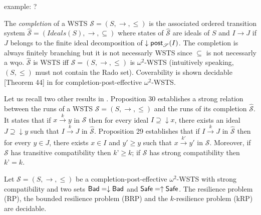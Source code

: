 example: ?
%
%




The \emph{completion}  \cite{BFM-ic17} of a WSTS $\mathscr{S}=(S,\rightarrow, \leq)$ is the associated ordered transition system $\hat{\mathscr{S}}=(Ideals(S),\rightarrow, \subseteq)$ where states of $\hat{\mathscr{S}}$ are ideals of $S$ and $I \rightarrow J$ if $J$ belongs to the finite ideal decomposition of $\downarrow \textsf{post}_{\mathscr{S}}(I)$. The completion is always finitely branching but it is not necessarly WSTS since $\subseteq$ is not necessarly a wqo. $\hat{\mathscr{S}}$ is WSTS iff $\mathscr{S}=(S,\rightarrow, \leq)$ is $\omega^2$-WSTS (intuitively speaking, $(S,\leq)$ must not contain the Rado set). Coverability is shown decidable  [Theorem 44] in \cite{BFM-ic17} for completion-post-effective $\omega^2$-WSTS.

Let us recall two other results in \cite{BFM-ic17}. Proposition 30 establishes a strong relation between the runs of a WSTS $\mathscr{S}=(S,\rightarrow, \leq)$ and the runs of its completion $\hat{\mathscr{S}}$. It states that if $x \xrightarrow{k} y$ in $\mathscr{S}$ then for every ideal $I \supseteq \downarrow x$, there exists an ideal $J \supseteq \downarrow y$ such that $I \xrightarrow{k} J$ in $\hat{\mathscr{S}}$. Proposition 29 establishes that if $I \xrightarrow{k} J$ in $\hat{\mathscr{S}}$ then for every $y \in J$, there exists $x \in I$ and $y' \geq y$ such that $x \xrightarrow{k'} y'$ in $\mathscr{S}$. Moreover, if $\mathscr{S}$ has transitive compatibility then $k’ \geq k$; if $\mathscr{S}$ has strong compatibility then $k’ = k$.


\begin{theorem}\label{down-up}
Let $\mathscr{S}=(S,\rightarrow, \leq)$ be a completion-post-effective $\omega^2$-WSTS with strong compatibility and two 
 sets $\textsf{Bad} = \downarrow \textsf{Bad}$ and $\textsf{Safe} = \uparrow \textsf{Safe}$.
The resilience problem (RP), the bounded resilience problem (BRP)
and the $k$-resilience problem (kRP) are decidable.
\end{theorem}

